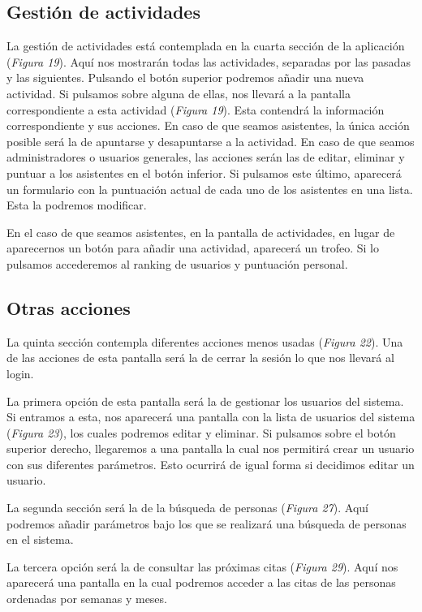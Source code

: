 \subsection{Gestión de actividades}

La gestión de actividades está contemplada en la cuarta sección de la aplicación (\textit{Figura 19}). Aquí nos mostrarán todas las actividades, separadas por las pasadas y las siguientes. Pulsando el botón superior podremos añadir una nueva actividad. Si pulsamos sobre alguna de ellas, nos llevará a la pantalla correspondiente a esta actividad (\textit{Figura 19}). Esta contendrá la información correspondiente y sus acciones. En caso de que seamos asistentes, la única acción posible será la de apuntarse y desapuntarse a la actividad. En caso de que seamos administradores o usuarios generales, las acciones serán las de editar, eliminar y puntuar a los asistentes en el botón inferior. Si pulsamos este último, aparecerá un formulario con la puntuación actual de cada uno de los asistentes en una lista. Esta la podremos modificar.

En el caso de que seamos asistentes, en la pantalla de actividades, en lugar de aparecernos un botón para añadir una actividad, aparecerá un trofeo. Si lo pulsamos accederemos al ranking de usuarios y puntuación personal.

\subsection{Otras acciones}

La quinta sección contempla diferentes acciones menos usadas (\textit{Figura 22}). Una de las acciones de esta pantalla será la de cerrar la sesión lo que nos llevará al login.

La primera opción de esta pantalla será la de gestionar los usuarios del sistema. Si entramos a esta, nos aparecerá una pantalla con la lista de usuarios del sistema (\textit{Figura 23}), los cuales podremos editar y eliminar. Si pulsamos sobre el botón superior derecho, llegaremos a una pantalla la cual nos permitirá crear un usuario con sus diferentes parámetros. Esto ocurrirá de igual forma si decidimos editar un usuario.

La segunda sección será la de la búsqueda de personas (\textit{Figura 27}). Aquí podremos añadir parámetros bajo los que se realizará una búsqueda de personas en el sistema.

La tercera opción será la de consultar las próximas citas (\textit{Figura 29}). Aquí nos aparecerá una pantalla en la cual podremos acceder a las citas de las personas ordenadas por semanas y meses.

